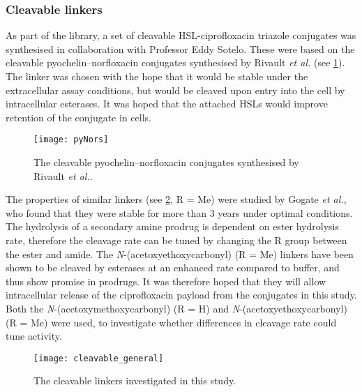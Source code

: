\subsubsection{Cleavable linkers\label{sec:cleavable_intro}}

As part of the library, a set of cleavable HSL-ciprofloxacin triazole conjugates was synthesised in collaboration with Professor Eddy Sotelo.
These were based on the cleavable pyochelin–norfloxacin conjugates synthesised by Rivault \textit{et al.}\cite{Rivault2007} (see \ref{fgr:pyNors}).
The linker was chosen with the hope that it would be stable under the extracellular assay conditions, but would be cleaved upon entry into the cell by intracellular esterases. It was hoped that the attached HSLs would improve retention of the conjugate in cells. 

\begin{figure}[H]
	\begin{center}
		\texttt{[image: pyNors]}
		\caption{The cleavable pyochelin–norfloxacin conjugates synthesised by Rivault \textit{et al.}\cite{Rivault2007}. \label{fgr:pyNors}}
	\end{center}
\end{figure}

The properties of similar linkers (see \ref{fgr:cleavable_general}, R = Me) were studied by Gogate \textit{et al.}, who found that they were stable for more than 3 years under optimal conditions\cite{Gogate1987}. 
The hydrolysis of a secondary amine prodrug is dependent on ester hydrolysis rate, therefore the cleavage rate can be tuned by changing the R group between the ester and amide\cite{Ortmann2005}. 
The \textit{N}-(acetoxyethoxycarbonyl) (R = Me) linkers have been shown to be cleaved by esterases at an enhanced rate compared to buffer, and thus show promise in prodrugs\cite{Gogate1987a}. It was therefore hoped that they will allow intracellular release of the ciprofloxacin  payload from the conjugates in this study. Both the \textit{N}-(acetoxymethoxycarbonyl) (R = H) and \textit{N}-(acetoxyethoxycarbonyl) (R = Me) were used, to investigate whether differences in cleavage rate could tune activity.

\begin{figure}[H]
	\begin{center}
		\texttt{[image: cleavable\_general]}
		\caption{The cleavable linkers investigated in this study. \label{fgr:cleavable_general}}
	\end{center}
\end{figure}

